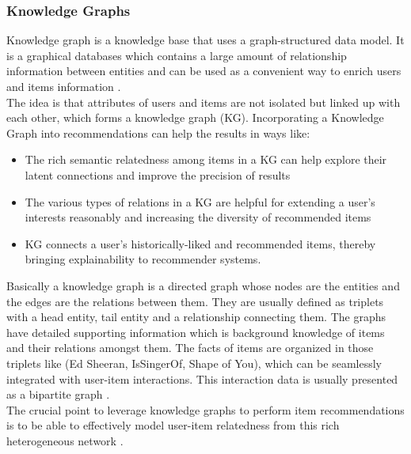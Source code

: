 \documentclass[\myFontSize,oneside,english,hidelinks,a4paper]{article}
\begin{document}
\subsubsection{Knowledge Graphs}
Knowledge graph is a knowledge base that uses a graph-structured data model. It is a graphical databases which contains a large amount of relationship information between entities and can be used as a convenient way to enrich users and items information \cite{Imene2022488}.\\
%
The idea is that attributes of users and items are not isolated but linked up with each other, which forms a knowledge graph (KG). Incorporating a Knowledge Graph into recommendations can help the results in ways like:
\begin{itemize}
\item The rich semantic relatedness among items in a KG can help explore their latent connections and improve the precision of results
\item The various types of relations in a KG are helpful for extending a user’s interests reasonably and increasing the diversity of recommended items
\item KG connects a user’s historically-liked and recommended items, thereby bringing explainability to recommender systems. \cite{Wang20193307}
\end{itemize}
%
Basically a knowledge graph is a directed graph whose nodes are the entities and the edges are the relations between them. They are usually defined as triplets with a head entity, tail entity and a relationship connecting them. The graphs have detailed supporting information which is background knowledge of items and their relations amongst them. The facts of items are organized in those triplets like (Ed Sheeran, IsSingerOf, Shape of You), which can be seamlessly integrated with user-item interactions. This interaction data is usually presented as a
bipartite graph \cite{pub.1120733877}. \\
The crucial point to leverage knowledge graphs to perform item recommendations is to be able to effectively model user-item relatedness from this rich heterogeneous network \cite{Palumbo201732}. \\ 
%
%
\end{document}
